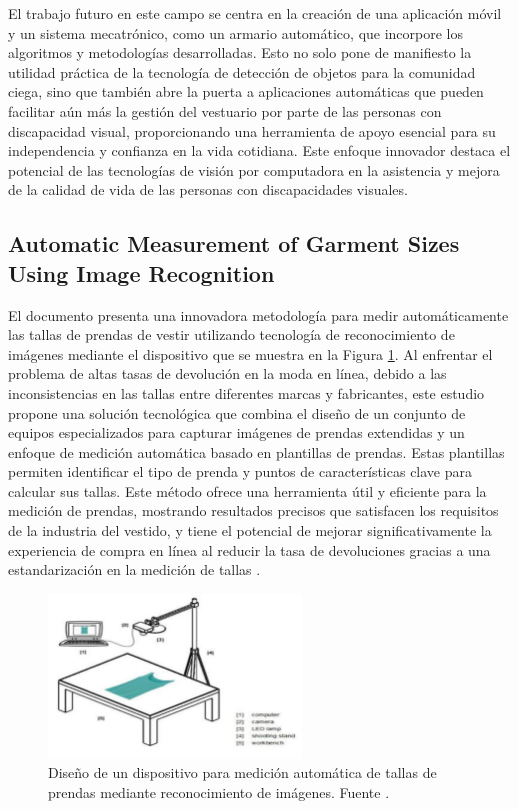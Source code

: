 El trabajo futuro en este campo se centra en la creación de una aplicación móvil y un sistema mecatrónico, como un armario automático, que incorpore los algoritmos y metodologías desarrolladas. Esto no solo pone de manifiesto la utilidad práctica de la tecnología de detección de objetos para la comunidad ciega, sino que también abre la puerta a aplicaciones automáticas que pueden facilitar aún más la gestión del vestuario por parte de las personas con discapacidad visual, proporcionando una herramienta de apoyo esencial para su independencia y confianza en la vida cotidiana. Este enfoque innovador destaca el potencial de las tecnologías de visión por computadora en la asistencia y mejora de la calidad de vida de las personas con discapacidades visuales.

\subsection{Automatic Measurement of Garment Sizes Using Image Recognition}

El documento presenta una innovadora metodología para medir automáticamente las tallas de prendas de vestir utilizando tecnología de reconocimiento de imágenes mediante el dispositivo que se muestra en la Figura \ref{fig:Automatic_Measurement}. Al enfrentar el problema de altas tasas de devolución en la moda en línea, debido a las inconsistencias en las tallas entre diferentes marcas y fabricantes, este estudio propone una solución tecnológica que combina el diseño de un conjunto de equipos especializados para capturar imágenes de prendas extendidas y un enfoque de medición automática basado en plantillas de prendas. Estas plantillas permiten identificar el tipo de prenda y puntos de características clave para calcular sus tallas. Este método ofrece una herramienta útil y eficiente para la medición de prendas, mostrando resultados precisos que satisfacen los requisitos de la industria del vestido, y tiene el potencial de mejorar significativamente la experiencia de compra en línea al reducir la tasa de devoluciones gracias a una estandarización en la medición de tallas \cite{Li2017AutomaticMeasurement}.

\begin{figure}[h]
	\centering
	\includegraphics[width=0.6\textwidth]{img/Automatic_Measurement.png}
	\caption[Diseño de un dispositivo para medición automática de tallas de prendas mediante reconocimiento de imágenes]{Diseño de un dispositivo para medición automática de tallas de prendas mediante reconocimiento de imágenes. Fuente \cite{Li2017AutomaticMeasurement}.}
	\label{fig:Automatic_Measurement}
\end{figure}


